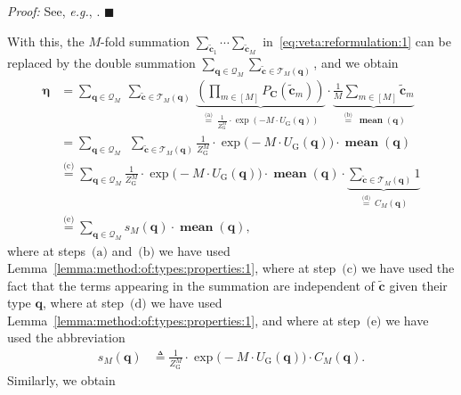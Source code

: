 \documentclass[journal, twocolumn]{IEEEtran}
\renewcommand{\mathbf}[1]{{\bm{#1}}}
\newcommand{\eg}{\emph{e.g.}}
\newcommand{\vect}[1]{\mathbf{#1}}
\newcommand{\set}[1]{\mathcal{#1}}
\newcommand{\defeq}{\triangleq}
\newcommand{\onestareq}{\overset{\text{(a)}}{=}}
\newcommand{\twostarseq}{\overset{\text{(b)}}{=}}
\newcommand{\threestarseq}{\overset{\text{(c)}}{=}}
\newcommand{\fourstarseq}{\overset{\text{(d)}}{=}}
\newcommand{\fivestarseq}{\overset{\text{(e)}}{=}}
\newcommand{\onestar}{\text{(a)}}
\newcommand{\twostars}{\text{(b)}}
\newcommand{\threestars}{\text{(c)}}
\newcommand{\fourstars}{\text{(d)}}
\newcommand{\fivestars}{\text{(e)}}
\newcommand{\veta}{\boldsymbol{\eta}}
\newcommand{\vC}{\vect{C}}
\newcommand{\vq}{\vect{q}}
\newcommand{\?}{\mathrm{?}}
\newcommand{\meanvect}{\operatorname{\mathbf{mean}}}
\newcommand{\tvc}{\vect{\tilde{c}}}
\newcommand{\vcsample}[1]{\tvc_{#1}}
\newcommand{\vcsampletot}{\tvc}
\newcommand{\setQsample}[1]{\set{Q}_{#1}}
\newcommand{\qedblack}{\hspace*{\fill}%
  $\blacksquare$\smallskip}
\newcommand{\UGibbs}{U_{\mathrm{G}}}
\newcommand{\ZGibbs}{Z_{\mathrm{G}}}
\newenvironment{Proof}%
  {\noindent \emph{Proof:}}{\qedblack}
\begin{document}
\begin{Proof}
  See, \eg, \cite{Csiszar:Korner:81, Cover:Thomas:91}.
\end{Proof}


With this, the $M$-fold summation $\sum_{\vcsample{1}} \cdots
\sum_{\vcsample{M}}$ in~\eqref{eq:veta:reformulation:1} can be replaced by the
double summation $\sum_{\vq \in \setQsample{M}} \sum_{\vcsampletot \in
  \set{T}_M(\vq)}$, and we obtain
\begin{align}
  \veta
    &= \sum_{\vq \in \setQsample{M}} \
         \sum_{\vcsampletot \in \set{T}_M(\vq)} \
           \underbrace{
             \left(
               \prod_{m \in [M]}
                 P_{\vC}(\vcsample{m})
             \right)
           }_{\onestareq \ \frac{1}{\ZGibbs^M} \cdot \exp(-M \cdot \UGibbs(\vq))}
           \cdot
           \underbrace{
             \frac{1}{M}
             \sum_{m \in [M]}
               \vcsample{m}
           }_{\twostarseq \ \meanvect(\vq)} \nonumber \\
    &= \sum_{\vq \in \setQsample{M}} \ \ 
         \sum_{\vcsampletot \in \set{T}_M(\vq)}
           \frac{1}{\ZGibbs^M}
           \cdot
           \exp\big( -M \cdot \UGibbs(\vq) \big)
           \cdot
           \meanvect(\vq) \nonumber \\
    &\threestarseq
       \sum_{\vq \in \setQsample{M}}
         \frac{1}{\ZGibbs^M}
         \cdot 
         \exp\big( -M \cdot \UGibbs(\vq) \big)
         \cdot
         \meanvect(\vq)
         \cdot
         \underbrace{
           \sum_{\vcsampletot \in \set{T}_M(\vq)}
             1
         }_{\fourstarseq \ C_M(\vq)} \nonumber \\
    &\fivestarseq
       \sum_{\vq \in \setQsample{M}}
         s_M(\vq)
         \cdot
         \meanvect(\vq),
           \label{eq:veta:reformulation:2}
\end{align}
where at steps~$\onestar$ and~$\twostars$ we have used
Lemma~\ref{lemma:method:of:types:properties:1}, where at step~$\threestars$ we
have used the fact that the terms appearing in the summation are independent
of $\vcsampletot$ given their type $\vq$, where at step~$\fourstars$ we have
used Lemma~\ref{lemma:method:of:types:properties:1}, and where at
step~$\fivestars$ we have used the abbreviation
\begin{align}
  s_M(\vq)
    &\defeq
       \frac{1}{\ZGibbs^M}
       \cdot 
       \exp\big( - M \cdot \UGibbs(\vq) \big)
       \cdot
       C_M(\vq).
         \label{eq:def:s:M:1}
\end{align}
Similarly, we obtain
\end{document}
